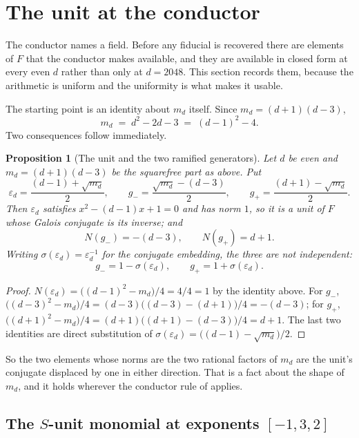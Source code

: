 \documentclass[12pt,a4paper]{article}
\newtheorem{proposition}[theorem]{Proposition}
\newcommand{\Fd}{F}
\newcommand{\md}{m_d}
\begin{document}
\section{The unit at the conductor}
\label{sec:unit}

The conductor names a field. Before any fiducial is recovered there are
elements of $\Fd$ that the conductor makes available, and they are available in
closed form at every even $d$ rather than only at $d=2048$. This section records
them, because the arithmetic is uniform and the uniformity is what makes it
usable.

The starting point is an identity about $\md$ itself. Since
$\md = (d+1)(d-3)$,
\[
  \md \;=\; d^2 - 2d - 3 \;=\; (d-1)^2 - 4 .
\]
Two consequences follow immediately.

\begin{proposition}[The unit and the two ramified generators]
\label{prop:unit}
Let $d$ be even and $\md = (d+1)(d-3)$ be the squarefree part as above. Put
\[
  \varepsilon_d = \frac{(d-1) + \sqrt{\md}}{2}, \qquad
  g_- = \frac{\sqrt{\md} - (d-3)}{2}, \qquad
  g_+ = \frac{(d+1) - \sqrt{\md}}{2}.
\]
Then $\varepsilon_d$ satisfies $x^2 - (d-1)x + 1 = 0$ and has norm $1$, so it is
a unit of $\Fd$ whose Galois conjugate is its inverse; and
\[
  N(g_-) = -(d-3), \qquad N(g_+) = d+1 .
\]
Writing $\sigma(\varepsilon_d) = \varepsilon_d^{-1}$ for the conjugate
embedding, the three are not independent:
\[
  g_- = 1 - \sigma(\varepsilon_d), \qquad g_+ = 1 + \sigma(\varepsilon_d).
\]
\end{proposition}

\begin{proof}
$N(\varepsilon_d) = \bigl((d-1)^2 - \md\bigr)/4 = 4/4 = 1$ by the identity
above. For $g_-$, $\bigl((d-3)^2 - \md\bigr)/4 = (d-3)\bigl((d-3)-(d+1)\bigr)/4
= -(d-3)$; for $g_+$, $\bigl((d+1)^2 - \md\bigr)/4 = (d+1)\bigl((d+1)-(d-3)\bigr)/4
= d+1$. The last two identities are direct substitution of
$\sigma(\varepsilon_d) = \bigl((d-1) - \sqrt{\md}\bigr)/2$.
\end{proof}

So the two elements whose norms are the two rational factors of $\md$ are the
unit's conjugate displaced by one in either direction. That is a fact about the
shape of $\md$, and it holds wherever the conductor rule of 
applies.

\subsection{The $S$-unit monomial at exponents $[-1,3,2]$}
\end{document}
